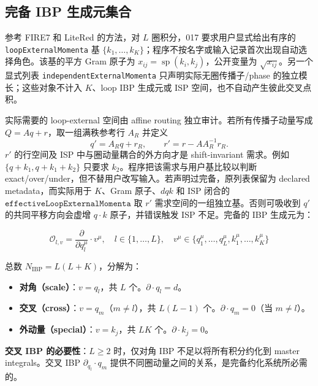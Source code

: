 ﻿\documentclass[a4paper,11pt]{article}
\begin{document}
\subsection{完备 IBP 生成元集合}

参考 FIRE7 和 LiteRed 的方法，对 $L$ 圈积分，017 要求用户显式给出有序的 \texttt{loopExternalMomenta} 基 $\{k_1,\ldots,k_K\}$；程序不按名字或输入记录首次出现自动选择角色。该基的平方 Gram 原子为 $x_{ij}=\operatorname{sp}(k_i,k_j)$，公开变量为 $\sqrt{x_{ij}}$。另一个显式列表 \texttt{independentExternalMomenta} 只声明实际无圈传播子/phase 的独立模长；这些对象不计入 $K$、loop IBP 生成元或 ISP 空间，也不自动产生彼此交叉点积。

实际需要的 loop-external 空间由 affine routing 独立审计。若所有传播子动量写成 $Q=Aq+r$，取一组满秩参考行 $A_R$ 并定义
\begin{equation}
 q'=A_Rq+r_R,\qquad r'=r-AA_R^{-1}r_R.
 \label{affineRoutingInvariant}
\end{equation}
$r'$ 的行空间及 ISP 中与圈动量耦合的外方向才是 shift-invariant 需求。例如 $\{q+k_1,q+k_1+k_2\}$ 只要求 $k_2$。程序把该需求与用户基比较以判断 exact/over/under，但不替用户改写输入。若声明过完备，原列表保留为 declared metadata，而实际用于 $K$、Gram 原子、$dqk$ 和 ISP 闭合的 $\texttt{effectiveLoopExternalMomenta}$ 取 $r'$ 需求空间的一组独立基。否则可吸收到 $q'$ 的共同平移方向会虚增 $q\cdot k$ 原子，并错误触发 ISP 不足。完备的 IBP 生成元为：

\begin{equation}
  \mathcal{O}_{l,v} = \frac{\partial}{\partial q_l^\mu} \cdot v^\mu, \quad l \in \{1,\ldots,L\}, \quad v^\mu \in \{q_1^\mu, \ldots, q_L^\mu, k_1^\mu, \ldots, k_K^\mu\}
\end{equation}

总数 $N_{\text{IBP}} = L(L + K)$，分解为：

\begin{itemize}
  \item \textbf{对角（scale）}：$v = q_l$，共 $L$ 个。$\partial \cdot q_l = d$。
  \item \textbf{交叉（cross）}：$v = q_m$（$m \neq l$），共 $L(L-1)$ 个。$\partial \cdot q_m = 0$（当 $m \neq l$）。
  \item \textbf{外动量（special）}：$v = k_j$，共 $LK$ 个。$\partial \cdot k_j = 0$。
\end{itemize}

\textbf{交叉 IBP 的必要性}：$L \geq 2$ 时，仅对角 IBP 不足以将所有积分约化到 master integrals。交叉 IBP $\partial_{q_l} \cdot q_m$ 提供不同圈动量之间的关系，是完备约化系统所必需的。
\end{document}
